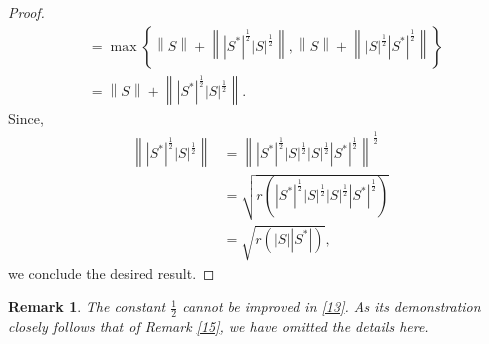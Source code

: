 \documentclass[12pt,twoside,reqno]{amsart}
\newtheorem{remark}{Remark}[section]
\numberwithin{equation}{section}
\begin{document}
\begin{proof}
\[\begin{aligned}
 & =\max \left\{ \left\| S \right\|+\left\| {{\left| {{S}^{*}} \right|}^{\frac{1}{2}}}{{\left| S \right|}^{\frac{1}{2}}} \right\|,\left\| S \right\|+\left\| {{\left| S \right|}^{\frac{1}{2}}}{{\left| {{S}^{*}} \right|}^{\frac{1}{2}}} \right\| \right\} \\ 
 & =\left\| S \right\|+\left\| {{\left| {{S}^{*}} \right|}^{\frac{1}{2}}}{{\left| S \right|}^{\frac{1}{2}}} \right\|. 
\end{aligned}\]
Since,
\[\begin{aligned}
   \left\| {{\left| {{S}^{*}} \right|}^{\frac{1}{2}}}{{\left| S \right|}^{\frac{1}{2}}} \right\|&={{\left\| {{\left| {{S}^{*}} \right|}^{\frac{1}{2}}}{{\left| S \right|}^{\frac{1}{2}}}{{\left| S \right|}^{\frac{1}{2}}}{{\left| {{S}^{*}} \right|}^{\frac{1}{2}}} \right\|}^{\frac{1}{2}}} \\ 
 & =\sqrt{r\left( {{\left| {{S}^{*}} \right|}^{\frac{1}{2}}}{{\left| S \right|}^{\frac{1}{2}}}{{\left| S \right|}^{\frac{1}{2}}}{{\left| {{S}^{*}} \right|}^{\frac{1}{2}}} \right)} \\ 
 & =\sqrt{r\left( \left| S \right|\left| {{S}^{*}} \right| \right)},  
\end{aligned}\]
we conclude the desired result.
\end{proof}






\begin{remark}
The constant $\frac{1}{2}$ cannot be improved in \eqref{13}. As its demonstration closely follows that of Remark \ref{15}, we have omitted the details here.
\end{remark}
\end{document}

